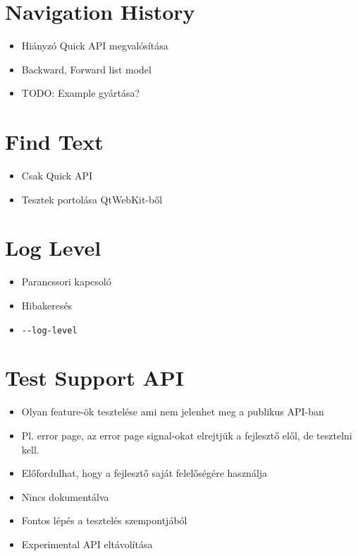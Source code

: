 \documentclass[12pt]{report}
\begin{document}
\section{Navigation History}

\begin{itemize}
    \item Hiányzó Quick API megvalósítása
    \item Backward, Forward list model
    \item TODO: Example gyártása?
\end{itemize}
\pagebreak

\section{Find Text}
\begin{itemize}
    \item Csak Quick API
    \item Tesztek portolása QtWebKit-ből
\end{itemize}
\pagebreak

\section{Log Level}
\begin{itemize}
    \item Parancssori kapcsoló
    \item Hibakeresés
    \item \texttt{-{}-log-level}
\end{itemize}
\pagebreak

\section{Test Support API}
\begin{itemize}
    \item Olyan feature-ök tesztelése ami nem jelenhet meg a publikus API-ban
    \item Pl. error page, az error page signal-okat elrejtjük a fejlesztő elől, de tesztelni
        kell.
    \item Előfordulhat, hogy a fejlesztő saját felelőségére használja
    \item Nincs dokumentálva
    \item Fontos lépés a tesztelés szempontjából
    \item Experimental API eltávolítása
\end{itemize}
\pagebreak
\end{document}
